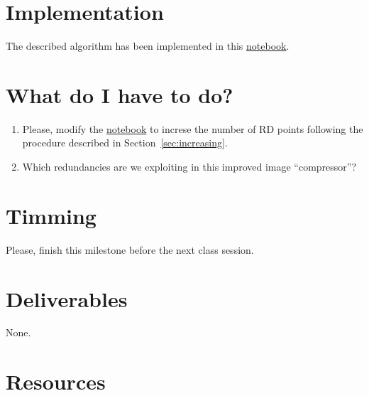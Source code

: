 \section{Implementation}
The described algorithm has been implemented in this
\href{https://github.com/Sistemas-Multimedia/Sistemas-Multimedia.github.io/blob/master/contents/RGB_SQ/RGB_SQ.ipynb}{notebook}.

\section{What do I have to do?}

\begin{enumerate}
\item Please, modify the
  \href{https://github.com/Sistemas-Multimedia/Sistemas-Multimedia.github.io/blob/master/contents/RGB_SQ/RGB_SQ.ipynb}{notebook}
  to increse the number of RD points following the procedure described
  in Section~\ref{sec:increasing}.
\item Which redundancies are we exploiting in this improved image
  ``compressor''?
\end{enumerate}

\section{Timming}

Please, finish this milestone before the next class session.

\section{Deliverables}

None.

\section{Resources}

\renewcommand{\addcontentsline}[3]{}%



